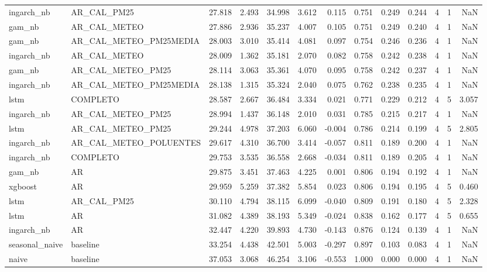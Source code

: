 \begin{tabular}{llrrrrrrrrrrr}
ingarch_nb & AR_CAL_PM25 & 27.818 & 2.493 & 34.998 & 3.612 & 0.115 & 0.751 & 0.249 & 0.244 & 4 & 1 & NaN \\
gam_nb & AR_CAL_METEO & 27.886 & 2.936 & 35.237 & 4.007 & 0.105 & 0.751 & 0.249 & 0.240 & 4 & 1 & NaN \\
gam_nb & AR_CAL_METEO_PM25MEDIA & 28.003 & 3.010 & 35.414 & 4.081 & 0.097 & 0.754 & 0.246 & 0.236 & 4 & 1 & NaN \\
ingarch_nb & AR_CAL_METEO & 28.009 & 1.362 & 35.181 & 2.070 & 0.082 & 0.758 & 0.242 & 0.238 & 4 & 1 & NaN \\
gam_nb & AR_CAL_METEO_PM25 & 28.114 & 3.063 & 35.361 & 4.070 & 0.095 & 0.758 & 0.242 & 0.237 & 4 & 1 & NaN \\
ingarch_nb & AR_CAL_METEO_PM25MEDIA & 28.138 & 1.315 & 35.324 & 2.040 & 0.075 & 0.762 & 0.238 & 0.235 & 4 & 1 & NaN \\
lstm & COMPLETO & 28.587 & 2.667 & 36.484 & 3.334 & 0.021 & 0.771 & 0.229 & 0.212 & 4 & 5 & 3.057 \\
ingarch_nb & AR_CAL_METEO_PM25 & 28.994 & 1.437 & 36.148 & 2.010 & 0.031 & 0.785 & 0.215 & 0.217 & 4 & 1 & NaN \\
lstm & AR_CAL_METEO_PM25 & 29.244 & 4.978 & 37.203 & 6.060 & -0.004 & 0.786 & 0.214 & 0.199 & 4 & 5 & 2.805 \\
ingarch_nb & AR_CAL_METEO_POLUENTES & 29.617 & 4.310 & 36.700 & 3.414 & -0.057 & 0.811 & 0.189 & 0.200 & 4 & 1 & NaN \\
ingarch_nb & COMPLETO & 29.753 & 3.535 & 36.558 & 2.668 & -0.034 & 0.811 & 0.189 & 0.205 & 4 & 1 & NaN \\
gam_nb & AR & 29.875 & 3.451 & 37.463 & 4.225 & 0.001 & 0.806 & 0.194 & 0.192 & 4 & 1 & NaN \\
xgboost & AR & 29.959 & 5.259 & 37.382 & 5.854 & 0.023 & 0.806 & 0.194 & 0.195 & 4 & 5 & 0.460 \\
lstm & AR_CAL_PM25 & 30.110 & 4.794 & 38.115 & 6.099 & -0.040 & 0.809 & 0.191 & 0.180 & 4 & 5 & 2.328 \\
lstm & AR & 31.082 & 4.389 & 38.193 & 5.349 & -0.024 & 0.838 & 0.162 & 0.177 & 4 & 5 & 0.655 \\
ingarch_nb & AR & 32.447 & 4.220 & 39.893 & 4.730 & -0.143 & 0.876 & 0.124 & 0.139 & 4 & 1 & NaN \\
seasonal_naive & baseline & 33.254 & 4.438 & 42.501 & 5.003 & -0.297 & 0.897 & 0.103 & 0.083 & 4 & 1 & NaN \\
naive & baseline & 37.053 & 3.068 & 46.254 & 3.106 & -0.553 & 1.000 & 0.000 & 0.000 & 4 & 1 & NaN \\
\bottomrule
\end{tabular}
